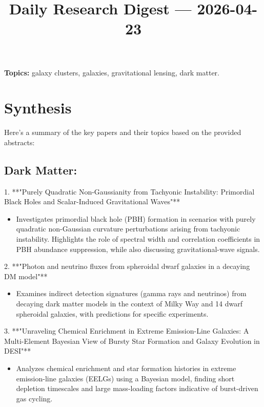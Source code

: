 \documentclass[11pt]{article}
\begin{document}
\title{Daily Research Digest --- 2026-04-23}
\author{}
\date{}
\maketitle
\textbf{Topics:} galaxy clusters, galaxies, gravitational lensing, dark matter.
\section*{Synthesis}
Here's a summary of the key papers and their topics based on the provided abstracts:
\subsection*{Dark Matter:}
1. **"Purely Quadratic Non-Gaussianity from Tachyonic Instability: Primordial Black Holes and Scalar-Induced Gravitational Waves"**
\begin{itemize}
\item Investigates primordial black hole (PBH) formation in scenarios with purely quadratic non-Gaussian curvature perturbations arising from tachyonic instability. Highlights the role of spectral width and correlation coefficients in PBH abundance suppression, while also discussing gravitational-wave signals.
\end{itemize}
2. **"Photon and neutrino fluxes from spheroidal dwarf galaxies in a decaying DM model"**
\begin{itemize}
\item Examines indirect detection signatures (gamma rays and neutrinos) from decaying dark matter models in the context of Milky Way and 14 dwarf spheroidal galaxies, with predictions for specific experiments.
\end{itemize}
3. **"Unraveling Chemical Enrichment in Extreme Emission-Line Galaxies: A Multi-Element Bayesian View of Bursty Star Formation and Galaxy Evolution in DESI"**
\begin{itemize}
\item Analyzes chemical enrichment and star formation histories in extreme emission-line galaxies (EELGs) using a Bayesian model, finding short depletion timescales and large mass-loading factors indicative of burst-driven gas cycling.
\end{itemize}
\end{document}
